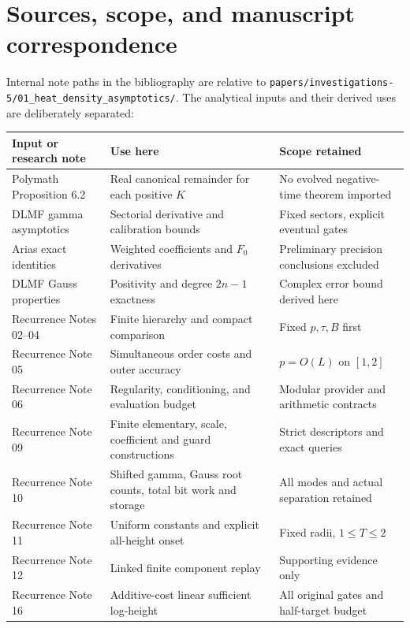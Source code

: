 \section{Sources, scope, and manuscript correspondence}
\label{app:provenance}
Internal note paths in the bibliography are relative to
\nolinkurl{papers/investigations-5/01_heat_density_asymptotics/}.
The analytical inputs and their derived uses are deliberately
separated:
\begin{center}
\small
\begin{tabular}{@{}>{\raggedright\arraybackslash}p{}>{\raggedright\arraybackslash}p{}>{\raggedright\arraybackslash}p{}@{}}
\toprule
Input or research note & Use here & Scope retained\\
\midrule
Polymath Proposition 6.2 &
Real canonical remainder for each positive \(K\) &
No evolved negative-time theorem imported\\[3pt]
DLMF gamma asymptotics &
Sectorial derivative and calibration bounds &
Fixed sectors, explicit eventual gates\\[3pt]
Arias exact identities &
Weighted coefficients and \(F_0\) derivatives &
Preliminary precision conclusions excluded\\[3pt]
DLMF Gauss properties &
Positivity and degree \(2n-1\) exactness &
Complex error bound derived here\\[3pt]
Recurrence Notes 02--04 &
Finite hierarchy and compact comparison &
Fixed \(p,\tau,B\) first\\[3pt]
Recurrence Note 05 &
Simultaneous order costs and outer accuracy &
\(p=O(L)\) on \([1,2]\)\\[3pt]
Recurrence Note 06 &
Regularity, conditioning, and evaluation budget &
Modular provider and arithmetic contracts\\[3pt]
Recurrence Note 09 &
Finite elementary, scale, coefficient and guard constructions &
Strict descriptors and exact queries\\[3pt]
Recurrence Note 10 &
Shifted gamma, Gauss root counts, total bit work and storage &
All modes and actual separation retained\\[3pt]
Recurrence Note 11 &
Uniform constants and explicit all-height onset &
Fixed radii, \(1\le T\le2\)\\[3pt]
Recurrence Note 12 &
Linked finite component replay &
Supporting evidence only\\[3pt]
Recurrence Note 16 &
Additive-cost linear sufficient log-height &
All original gates and half-target budget\\[3pt]

\end{tabular}
\end{center}
